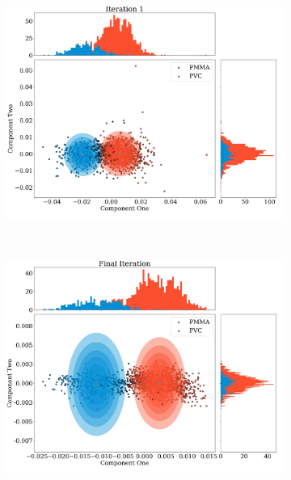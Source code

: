 \documentclass[a4paper,11pt]{article}
\begin{document}
\begin{figure}[htbp]
    \centering
    \begin{subfigure}[b]{0.32\textwidth}
        \includegraphics[width=\textwidth]{figures/PCAsphericalbefore.png}
    \end{subfigure}
    ~ %
    \begin{subfigure}[b]{0.32\textwidth}
        \includegraphics[width=\textwidth]{figures/PCAsphericalafter.png}
    \end{subfigure}
    \begin{subfigure}[b]{0.32\textwidth}

\end{subfigure}
\end{figure}
\end{document}
